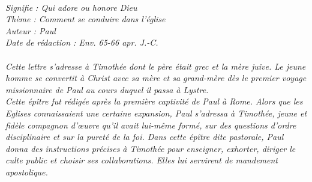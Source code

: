 \BFont
\noindent\hrulefill
\textit{
\bigskip
{\centering{}
\\Signifie : Qui adore ou honore Dieu
\\Thème : Comment se conduire dans l'église
\\Auteur : Paul
\\Date de rédaction : Env. 65-66 apr. J.-C.\\}
}
\textit{
\\Cette lettre s’adresse à Timothée dont le père était grec et la mère juive. Le jeune homme se convertit à Christ avec sa mère et sa grand-mère dès le premier voyage missionnaire de Paul au cours duquel il passa à Lystre.
\bigskip
\\Cette épître fut rédigée après la première captivité de Paul à Rome. Alors que les Eglises connaissaient une certaine expansion, Paul s’adressa à Timothée, jeune et fidèle compagnon d’œuvre qu’il avait lui-même formé, sur des questions d’ordre disciplinaire et sur la pureté de la foi. Dans cette épître dite pastorale, Paul donna des instructions précises à Timothée pour enseigner, exhorter, diriger le culte public et choisir ses collaborations. Elles lui servirent de mandement apostolique.\bigskip
}
\par\nobreak\noindent\hrulefill
